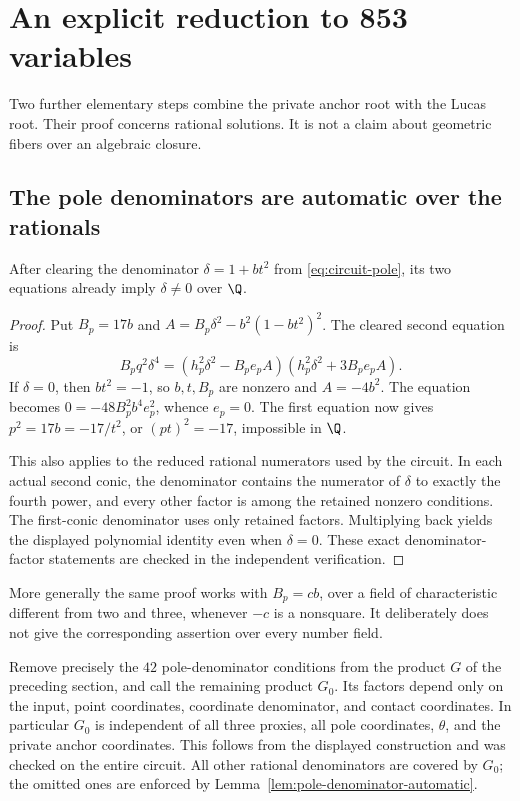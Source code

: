 \section{An explicit reduction to 853 variables}
\label{sec:explicit-853}

Two further elementary steps combine the private anchor root with the
Lucas root. Their proof concerns rational solutions. It is not a claim
about geometric fibers over an algebraic closure.

\subsection{The pole denominators are automatic over the rationals}

\begin{lemma}\label{lem:pole-denominator-automatic}
After clearing the denominator $\delta=1+bt^2$ from
\eqref{eq:circuit-pole}, its two equations already imply
$\delta\ne0$ over $\Q$.
\end{lemma}
\begin{proof}
Put $B_p=17b$ and
$A=B_p\delta^2-b^2(1-bt^2)^2$. The cleared second equation is
\[
 B_pq^2\delta^4
 =(h_p^2\delta^2-B_pe_pA)(h_p^2\delta^2+3B_pe_pA).
\]
If $\delta=0$, then $bt^2=-1$, so $b,t,B_p$ are nonzero and
$A=-4b^2$. The equation becomes $0=-48B_p^2b^4e_p^2$, whence
$e_p=0$. The first equation now gives $p^2=17b=-17/t^2$,
or $(pt)^2=-17$, impossible in $\Q$.

This also applies to the reduced rational numerators used by the
circuit. In each actual second conic, the denominator contains the
numerator of $\delta$ to exactly the fourth power, and every other
factor is among the retained nonzero conditions. The first-conic
denominator uses only retained factors. Multiplying back yields the
displayed polynomial identity even when $\delta=0$. These exact
denominator-factor statements are checked in the independent verification.
\end{proof}

More generally the same proof works with $B_p=cb$, over a field of
characteristic different from two and three, whenever $-c$ is a
nonsquare. It deliberately does not give the corresponding assertion
over every number field.

Remove precisely the $42$ pole-denominator conditions from the product
$G$ of the preceding section, and call the remaining product $G_0$.
Its factors depend only on the input, point coordinates, coordinate
denominator, and contact coordinates. In particular $G_0$ is independent
of all three proxies, all pole coordinates, $\theta$, and the private
anchor coordinates. This follows from the displayed construction and
was checked on the entire circuit. All other rational denominators
are covered by $G_0$; the omitted ones are enforced by
Lemma~\ref{lem:pole-denominator-automatic}.

